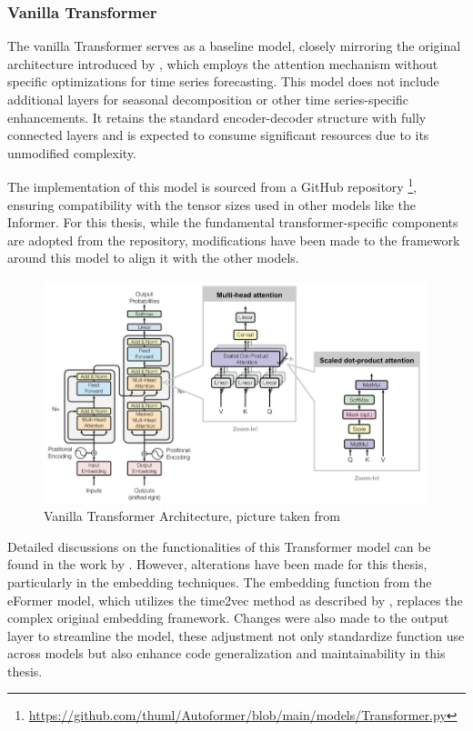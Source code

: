 \documentclass{article}
\begin{document}
\subsubsection{Vanilla Transformer}

The vanilla Transformer serves as a baseline model, closely mirroring the original architecture introduced by \cite{vanilla-transformer}, which employs the attention mechanism without specific optimizations for time series forecasting. This model does not include additional layers for seasonal decomposition or other time series-specific enhancements. It retains the standard encoder-decoder structure with fully connected layers and is expected to consume significant resources due to its unmodified complexity.

The implementation of this model is sourced from a GitHub repository \footnote{\url{https://github.com/thuml/Autoformer/blob/main/models/Transformer.py}}, ensuring compatibility with the tensor sizes used in other models like the Informer. For this thesis, while the fundamental transformer-specific components are adopted from the repository, modifications have been made to the framework around this model to align it with the other models.

\begin{figure}
    \centering
    \includegraphics[width=\linewidth]{graphs/models/VanillaTransformer.png}
    \caption{Vanilla Transformer Architecture, picture taken from \cite{vanilla-transformer}}
    \label{fig:VanillaTransformer_architecture}
\end{figure}

Detailed discussions on the functionalities of this Transformer model can be found in the work by \cite{vanilla-transformer}. However, alterations have been made for this thesis, particularly in the embedding techniques. The embedding function from the eFormer model, which utilizes the time2vec method as described by \cite{time2vec}, replaces the complex original embedding framework. Changes were also made to the output layer to streamline the model, these adjustment not only standardize function use across models but also enhance code generalization and maintainability in this thesis.
\end{document}
